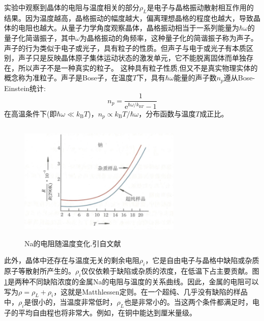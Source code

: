 实验中观察到晶体的电阻与温度相关的部分$\rho_L$是电子与晶格振动散射相互作用的结果。因为温度越高，晶格振动的幅度越大，偏离理想晶格的程度也越大，导致晶体的电阻也越大。从量子力学角度观察晶体，晶格振动相当于一系列能量为$\hbar\omega$的量子化简谐振子，其中$\omega$为晶格振动的角频率，这种量子化的简谐振子称为声子。声子的行为类似于电子或光子，具有粒子的性质。但声子与电于或光子有本质区别，声子只是反映晶体原子集体运动状态的激发单元，它不能脱离固体而单独存在，所以声子不是一种真实的粒子。%
这种具有粒子性质,但又不是真实物理实体的概念称为准粒子。声子是Bose子，在温度$T$下，具有$\hbar\omega$能量的声子数$n_p$遵从Bose-Einstein统计:
\begin{equation}
	n_p=\dfrac1{\mathrm{e}^{\hbar\omega/k_{\mathrm{B}T}}-1}
	\label{eq:Bose-Einstein}
\end{equation}
在高温条件下(即$\hbar\omega\ll k_{\mathrm{B}}T$)，$n_p\propto k_{\mathrm{B}}T/\hbar\omega$，分布函数与温度$T$成正比。
\begin{figure}[h!]
\centering
\vspace*{-0.10in}
\includegraphics[height=2.25in,width=3.05in,viewport=0 0 70 50,clip]{Figures/Na_Resistity-Temperature.png}
\caption{\small \textrm{Na的电阻随温度变化.引自文献}}%
\label{Fig:Na-Resistity}
\end{figure}

此外，晶体中还存在与温度无关的剩余电阻$\rho_i$，它是自由电子与晶格中缺陷或杂质原子等散射所产生的。$\rho_i$仅仅依赖于缺陷或杂质的浓度，在低温下占主要贡献。图\ref{Fig:Na-Resistity}是两种不同缺陷浓度的金属Na的电阻与温度的关系曲线。因此，金属的电阻可以写为$\rho=\rho_L+\rho_i$，这就是Matthlessen定则。在一个超纯、几乎没有缺陷的样品中，$\rho_i$是很小的，当温度非常低时，$\rho_L$也是非常小的。当这两个条件都满足时，电子的平均自由程也将非常大。例如，在铜中能达到厘米量级。

